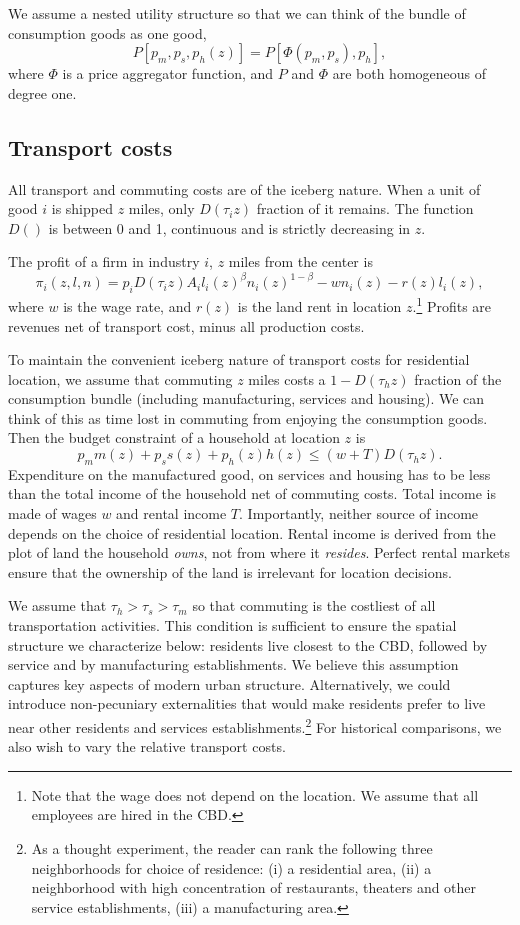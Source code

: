 \documentclass[12pt]{article}
\begin{document}
We assume a nested utility structure so that we can think of the bundle of consumption goods as one good,
    \[
P[p_m,p_s,p_h(z)] = P[\Phi(p_m,p_s),p_h],
    \]
where $\Phi$ is a price aggregator function, and $P$ and $\Phi$ are both homogeneous of degree one.

\subsection{Transport costs}
All transport and commuting costs are of the iceberg nature. When a unit of good $i$ is shipped $z$ miles, only $D(\tau_i z)$ fraction of it remains. The function $D()$ is between 0 and 1, continuous and is strictly decreasing in $z$.

The profit of a firm in industry $i$, $z$ miles from the center is
\[
\pi_i(z,l,n) = p_iD(\tau_i z)A_il_i(z)^\beta n_i(z)^{1-\beta} - wn_i(z) - r(z)l_i(z),
\]
where $w$ is the wage rate, and $r(z)$ is the land rent in location $z$.\footnote{Note that the wage does not depend on the location. We assume that all employees are hired in the CBD.} Profits are revenues net of transport cost, minus all production costs.

To maintain the convenient iceberg nature of transport costs for residential location, we assume that commuting $z$ miles costs a $1-D(\tau_h z)$ fraction of the consumption bundle (including manufacturing, services and housing). We can think of this as time lost in commuting from enjoying the consumption goods. Then the budget constraint of a household at location $z$ is
\[
p_m m(z) + p_s s(z) + p_h(z) h(z) \le (w+T)D(\tau_h z).
\]
Expenditure on the manufactured good, on services and housing has to be less than the total income of the household net of commuting costs. Total income is made of wages $w$ and rental income $T$. Importantly, neither source of income depends on the choice of residential location. Rental income is derived from the plot of land the household \emph{owns}, not from where it \emph{resides}. Perfect rental markets ensure that the ownership of the land is irrelevant for location decisions.

We assume that $\tau_h>\tau_s>\tau_m$ so that commuting is the costliest of all transportation activities. This condition is sufficient to ensure the spatial structure we characterize below: residents live closest to the CBD, followed by service and by manufacturing establishments. We believe this assumption captures key aspects of modern urban structure. Alternatively, we could introduce non-pecuniary externalities that would make residents prefer to live near other residents and services establishments.\footnote{As a thought experiment, the reader can rank the following three neighborhoods for choice of residence: (i) a residential area, (ii) a neighborhood with high concentration of restaurants, theaters and other service establishments, (iii) a manufacturing area.} For historical comparisons, we also wish to vary the relative transport costs.
\end{document}
